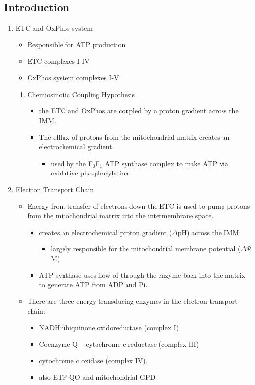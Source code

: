 \documentclass{scrartcl}
\begin{document}
\subsection{Introduction}
\label{sec:org1104068}
\begin{enumerate}
\item ETC and OxPhos system
\label{sec:org684d7f5}
\begin{itemize}
\item Responsible for ATP production
\item ETC complexes I-IV
\item OxPhos system complexes I-V
\end{itemize}
\begin{enumerate}
\item Chemiosmotic Coupling Hypothesis
\label{sec:org0ce85d8}
\begin{itemize}
\item the ETC and OxPhos are coupled by a proton gradient across the IMM.
\item The efflux of protons from the mitochondrial matrix creates an electrochemical gradient.
\begin{itemize}
\item used by the F\(_{\text{0}}\)F\(_{\text{1}}\) ATP synthase complex to make ATP via oxidative phosphorylation.
\end{itemize}
\end{itemize}
\end{enumerate}
\item Electron Transport Chain
\label{sec:orgf7bc1fa}
\begin{itemize}
\item Energy from transfer of electrons down the ETC is used to pump
protons from the mitochondrial matrix into the intermembrane space.
\begin{itemize}
\item creates an electrochemical proton gradient (\(\Delta\)pH) across the IMM.
\begin{itemize}
\item largely responsible for the mitochondrial membrane potential (\(\Delta \Psi\)M).
\end{itemize}
\item ATP synthase uses flow of  through the enzyme back into the
matrix to generate ATP from ADP and Pi.
\end{itemize}
\item There are three energy-transducing enzymes in the electron transport
chain:
\begin{itemize}
\item NADH:ubiquinone oxidoreductase (complex I)
\item Coenzyme Q – cytochrome c reductase (complex III)
\item cytochrome c oxidase (complex IV).
\item also ETF-QO and mitochondrial GPD
\end{itemize}
\end{itemize}


\end{enumerate}
\end{document}
